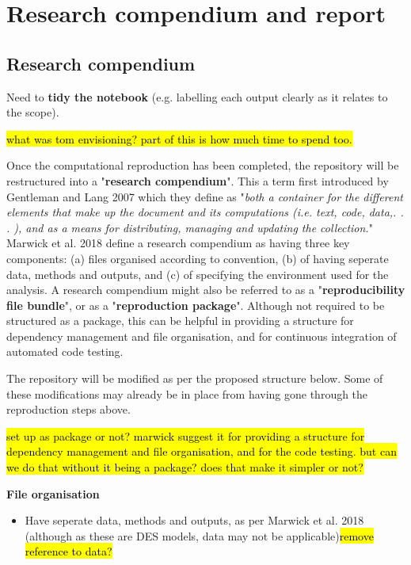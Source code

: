 \section{Research compendium and report}

\subsection{Research compendium} \label{sec:compendium}

Need to \textbf{tidy the notebook} (e.g. labelling each output clearly as it relates to the scope).

\hl{what was tom envisioning? part of this is how much time to spend too.}

Once the computational reproduction has been completed, the repository will be restructured into a "\textbf{research compendium}". This a term first introduced by Gentleman and Lang 2007\autocite{gentleman_statistical_2007} which they define as "\textit{both a container for the different elements that make up the document and its computations (i.e. text, code, data,. . . ), and as a means for distributing, managing and updating the collection.}"\autocite{gentleman_statistical_2007} Marwick et al. 2018 define a research compendium as having three key components: (a) files organised according to convention, (b) of having seperate data, methods and outputs, and (c) of specifying the environment used for the analysis.\autocite{marwick_packaging_2018} A research compendium might also be referred to as a "\textbf{reproducibility file bundle}",\autocite{arguillas_10_2022} or as a "\textbf{reproduction package}".\autocite{krafczyk_learning_2021} Although not required to be structured as a package, this can be helpful in providing a structure for dependency management and file organisation, and for continuous integration of automated code testing.\autocite{marwick_packaging_2018}

The repository will be modified as per the proposed structure below. Some of these modifications may already be in place from having gone through the reproduction steps above.

\hl{set up as package or not? marwick suggest it for providing a structure for dependency management and file organisation, and for the code testing. but can we do that without it being a package? does that make it simpler or not?}

\textbf{File organisation}
\begin{itemize}
    \item Have seperate data, methods and outputs, as per Marwick et al. 2018\autocite{marwick_packaging_2018} (although as these are DES models, data may not be applicable)\hl{remove reference to data?}
\end{itemize}

